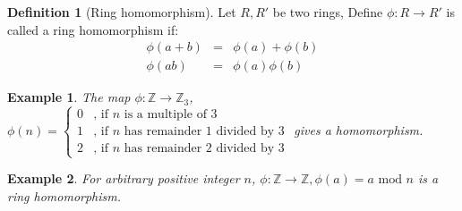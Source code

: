 \documentclass{article}
\theoremstyle{MyNonumberplain}
\theoremstyle{break}
\newcommand{\tmop}{\text}
\theoremstyle{break}
\newtheorem{example}{Example}[section]
\theoremstyle{break}
\theoremstyle{definition}
\theoremstyle{break}
\newtheorem{definition}{Definition}[section]
\begin{document}
\begin{defbox}
    \begin{definition}[Ring homomorphism]
        Let $R, R'$ be two rings, Define $\phi : R \rightarrow R'$ is called a ring
        homomorphism if:
        \begin{eqnarray*}
          \phi (a + b) & = & \phi (a) + \phi (b)\\
          \phi (a b) & = & \phi (a) \phi (b)
        \end{eqnarray*}
    \end{definition}
\end{defbox}

\begin{expbox}
    \begin{example}
        The map $\phi : \mathbb{Z} \rightarrow \mathbb{Z}_3$, $\phi (n) =
        \left\{\begin{array}{ll}
          0 & \text{, if $n$ is a multiple of 3}\\
          1 & \text{, if $n$ has remainder 1 divided by 3}\\
          2 & \text{, if $n$ has remainder 2 divided by 3}
        \end{array}\right.$ gives a homomorphism.
    \end{example}
\end{expbox}

\begin{expbox}
    \begin{example}
        For arbitrary positive integer $n$, $\phi : \mathbb{Z} \rightarrow \mathbb{Z},
        \phi (a) = a \tmop{ mod } n$ is a ring homomorphism.
    \end{example}
\end{expbox}
\end{document}
